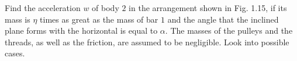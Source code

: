 \item Find the acceleration \( w \) of body \( 2 \) in the arrangement shown in Fig. 1.15, if its mass is \( \eta \) times as great as the mass of bar \( 1 \) and the angle that the inclined plane forms with the horizontal is equal to \( \alpha \). The masses of the pulleys and the threads, as well as the friction, are assumed to be negligible. Look into possible cases.
    \begin{center}
    \end{center}

